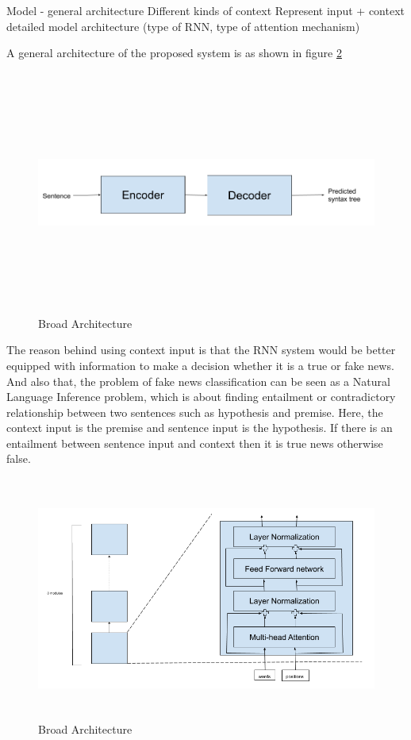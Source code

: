\documentclass[a4paper, 11pt]{article}
\begin{document}
Model - general architecture
Different kinds of context
Represent input + context
detailed model architecture (type of RNN, type of attention mechanism)

 A general architecture of the proposed system is as shown in figure \ref{fig:broad_architecture}

\begin{figure}[htpb]
    \centering
    \includegraphics[width=\textwidth,height=8cm,keepaspectratio=true]
    {encoder-decoder.png}
    \caption{
        Broad Architecture
    }
    \label{fig:broad_architecture}
\end{figure}

The reason behind using context input is that the RNN system would be better equipped with information to make a decision whether it is a true or fake news. And also that, the problem of fake news classification can be seen as a Natural Language Inference \parencite{Parikh2016} problem, which is about finding entailment or contradictory relationship between two sentences such as hypothesis and premise. Here, the context input is the premise and sentence input is the hypothesis. If there is an entailment between sentence input and context then it is true news otherwise false.

\begin{figure}[htpb]
    \centering
    \includegraphics[width=\textwidth,height=8cm,keepaspectratio=true]
    {encoder.png}
    \caption{
        Broad Architecture
    }
    \label{fig:broad_architecture}
\end{figure}
\end{document}
